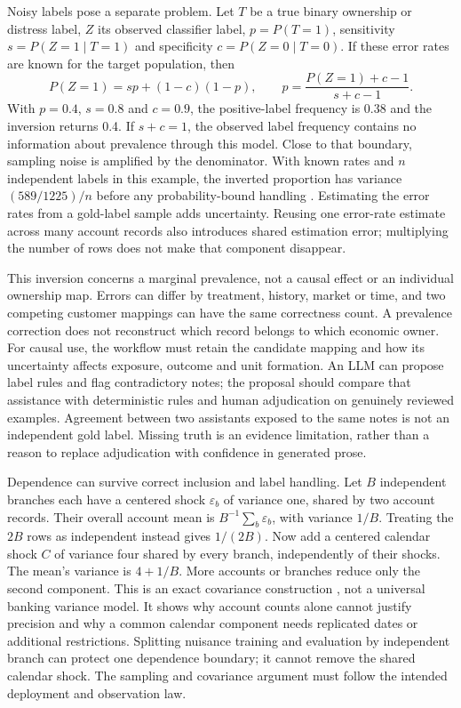 Noisy labels pose a separate problem. Let $T$ be a true binary ownership or
distress label, $Z$ its observed classifier label, $p=P(T=1)$, sensitivity
$s=P(Z=1\mid T=1)$ and specificity $c=P(Z=0\mid T=0)$. If these error rates are
known for the target population, then
\[
 P(Z=1)=sp+(1-c)(1-p),\qquad
 p=\frac{P(Z=1)+c-1}{s+c-1}.
\]
With $p=0.4$, $s=0.8$ and $c=0.9$, the positive-label frequency is 0.38 and
the inversion returns 0.4. If $s+c=1$, the observed label frequency contains
no information about prevalence through this model. Close to that boundary,
sampling noise is amplified by the denominator. With known rates and $n$
independent labels in this example, the inverted proportion has variance
$(589/1225)/n$ before any probability-bound handling
\cite{exec14_workflow_oracle}. Estimating the error rates from a gold-label
sample adds uncertainty. Reusing one error-rate estimate across many account
records also introduces shared estimation error; multiplying the number of
rows does not make that component disappear.

This inversion concerns a marginal prevalence, not a causal effect or an
individual ownership map. Errors can differ by treatment, history, market or
time, and two competing customer mappings can have the same correctness
count. A prevalence correction does not reconstruct which record belongs to
which economic owner. For causal use, the workflow must retain the candidate
mapping and how its uncertainty affects exposure, outcome and unit formation.
An LLM can propose label rules and flag contradictory notes; the proposal
should compare that assistance with deterministic rules and human adjudication
on genuinely reviewed examples. Agreement between two assistants exposed to
the same notes is not an independent gold label. Missing truth is an evidence
limitation, rather than a reason to replace adjudication with confidence in
generated prose.

Dependence can survive correct inclusion and label handling. Let $B$ independent
branches each have a centered shock $\varepsilon_b$ of variance one, shared
by two account records. Their overall account mean is
$B^{-1}\sum_b\varepsilon_b$, with variance $1/B$. Treating the $2B$ rows as
independent instead gives $1/(2B)$. Now add a centered calendar shock $C$ of
variance four shared by every branch, independently of their shocks. The
mean's variance is $4+1/B$. More accounts or branches reduce only the second
component. This is an exact covariance construction
\cite{exec14_workflow_oracle}, not a universal banking variance model. It
shows why account counts alone cannot justify precision and why a common
calendar component needs replicated dates or additional restrictions.
Splitting nuisance training and evaluation by independent branch can protect
one dependence boundary; it cannot remove the shared calendar shock. The
sampling and covariance argument must follow the intended deployment and
observation law.

